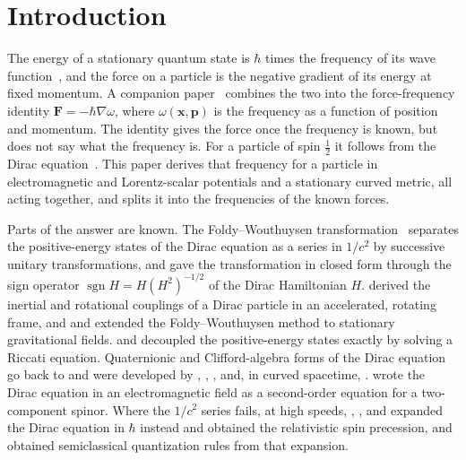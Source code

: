 \documentclass[aps,prd,onecolumn,tightenlines,nofootinbib,notitlepage,11pt,floatfix]{revtex4-2}
\theoremstyle{indentedtheorem}
\begin{document}
\maketitle

\section{Introduction}
\label{sec:intro}

The energy of a stationary quantum state is $\hbar$ times the frequency of its wave function~\citep{Planck1901Radiation,Einstein1905Photoelectric}, and the force on a particle is the negative gradient of its energy at fixed momentum. A companion paper~\citep{HutchisonSGM2026} combines the two into the force-frequency identity $\mathbf{F}=-\hbar\nabla\omega$, where $\omega(\mathbf{x},\mathbf{p})$ is the frequency as a function of position and momentum. The identity gives the force once the frequency is known, but does not say what the frequency is. For a particle of spin $\tfrac{1}{2}$ it follows from the Dirac equation~\citep{Dirac1928Quantum}. This paper derives that frequency for a particle in electromagnetic and Lorentz-scalar potentials and a stationary curved metric, all acting together, and splits it into the frequencies of the known forces.

Parts of the answer are known. The Foldy--Wouthuysen transformation~\citep{Foldy1950Dirac} separates the positive-energy states of the Dirac equation as a series in $1/c^2$ by successive unitary transformations, and \citet{Eriksen1958Foldy} gave the transformation in closed form through the sign operator $\operatorname{sgn}H=H(H^2)^{-1/2}$ of the Dirac Hamiltonian $H$. \citet{HehlNi1990Inertial} derived the inertial and rotational couplings of a Dirac particle in an accelerated, rotating frame, and \citet{Silenko2008Foldy} and \citet{ObukhovSilenkoTeryaev2009Spin,ObukhovSilenkoTeryaev2011Dirac,ObukhovSilenkoTeryaev2013Spin} extended the Foldy--Wouthuysen method to stationary gravitational fields. \citet{Heully1986Diagonalisation} and \citet{KutzelniggLiu2005Quasirelativistic} decoupled the positive-energy states exactly by solving a Riccati equation. Quaternionic and Clifford-algebra forms of the Dirac equation go back to \citet{Lanczos1929Tensoranalytischen} and were developed by \citet{Hestenes1967Real}, \citet{DeLeoRotelli1994Translations}, \citet{DeLeoRodrigues1998Quaternionic}, and, in curved spacetime, \citet{LasenbyDoranGull1998Gravity}. \citet{FeynmanGellMann1958Theory} wrote the Dirac equation in an electromagnetic field as a second-order equation for a two-component spinor. Where the $1/c^2$ series fails, at high speeds, \citet{RubinowKeller1963Asymptotic}, \citet{BolteKeppeler1999Semiclassical}, and \citet{PanatiSpohnTeufel2003Space} expanded the Dirac equation in $\hbar$ instead and obtained the relativistic spin precession, and \citet{Keppeler2003Semiclassical} obtained semiclassical quantization rules from that expansion.
\end{document}
